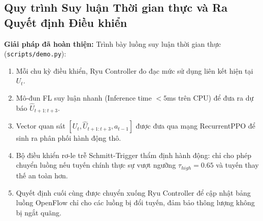 \documentclass[11pt,a4paper]{article}
\begin{document}
\subsection{Quy trình Suy luận Thời gian thực và Ra Quyết định Điều khiển}
\textbf{Giải pháp đã hoàn thiện:} Trình bày luồng suy luận thời gian thực (\texttt{scripts/demo.py}):
\begin{enumerate}
    \item Mỗi chu kỳ điều khiển, Ryu Controller đo đạc mức sử dụng liên kết hiện tại $U_t$.
    \item Mô-đun FL suy luận nhanh (Inference time $< 5$ms trên CPU) để đưa ra dự báo $\hat{U}_{t+1:t+3}$.
    \item Vector quan sát $[U_t, \hat{U}_{t+1:t+3}, a_{t-1}]$ được đưa qua mạng RecurrentPPO để sinh ra phân phối hành động thô.
    \item Bộ điều khiển rơ-le trễ Schmitt-Trigger thẩm định hành động: chỉ cho phép chuyển luồng nếu tuyến chính thực sự vượt ngưỡng $\tau_{high}=0.65$ và tuyến thay thế an toàn hơn.
    \item Quyết định cuối cùng được chuyển xuống Ryu Controller để cập nhật bảng luồng OpenFlow chỉ cho các luồng bị đổi tuyến, đảm bảo thông lượng không bị ngắt quãng.
\end{enumerate}
\end{document}
